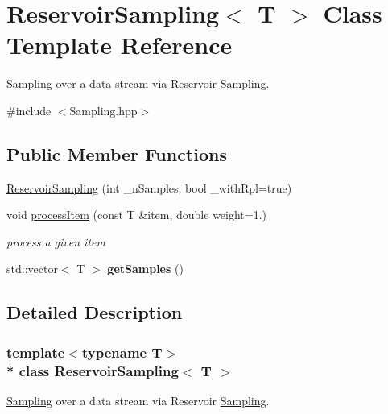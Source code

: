 \hypertarget{classReservoirSampling}{}\section{Reservoir\+Sampling$<$ T $>$ Class Template Reference}
\label{classReservoirSampling}


\hyperlink{classSampling}{Sampling} over a data stream via Reservoir \hyperlink{classSampling}{Sampling}.  




{\ttfamily \#include $<$Sampling.\+hpp$>$}

\subsection*{Public Member Functions}
\begin{DoxyCompactItemize}
\item 
\hyperlink{classReservoirSampling_acd0418785ebe64ee78d47fc78cf2e5a4}{Reservoir\+Sampling} (int \+\_\+n\+Samples, bool \+\_\+with\+Rpl=true)
\item 
void \hyperlink{classReservoirSampling_abe122b5e851ff472510280efe1df0c87}{process\+Item} (const T \&item, double weight=1.)
\begin{DoxyCompactList}\small\item\em process a given item \end{DoxyCompactList}\item 
std\+::vector$<$ T $>$ {\bfseries get\+Samples} ()\hypertarget{classReservoirSampling_af613dd7fe24d21828386b20bd61bbb8c}{}\label{classReservoirSampling_af613dd7fe24d21828386b20bd61bbb8c}

\end{DoxyCompactItemize}


\subsection{Detailed Description}
\subsubsection*{template$<$typename T$>$\\*
class Reservoir\+Sampling$<$ T $>$}

\hyperlink{classSampling}{Sampling} over a data stream via Reservoir \hyperlink{classSampling}{Sampling}. 


